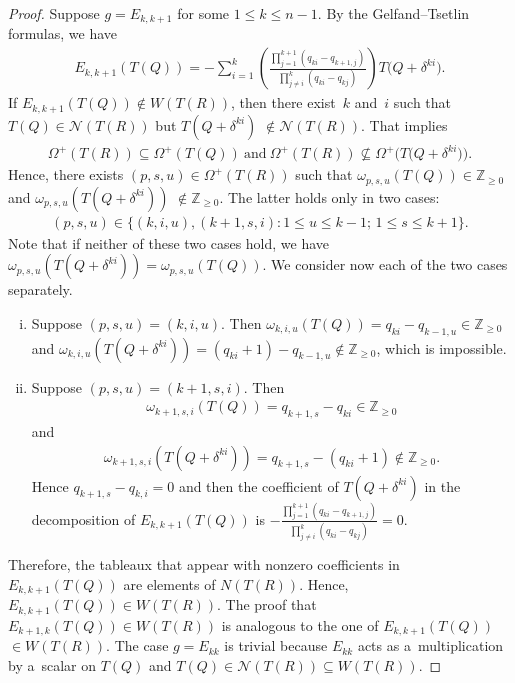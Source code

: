 \documentclass[pdftex]{sigma}
\numberwithin{equation}{section}
\begin{document}
\begin{proof}
Suppose $g=E_{k,k+1}$ for some $1\leq k\leq n-1$.
By the Gelfand--Tsetlin formulas, we have
\begin{gather*}
E_{k,k+1}(T(Q))=-\sum\limits_{i=1}^{k}\left(\frac{\prod\limits_{j=1}^{k+1}(q_{ki}-q_{k+1,j})}{\prod\limits_{j\neq
i}^{k}(q_{ki}-q_{kj})}\right)T\big(Q+\delta^{ki}\big).
\end{gather*}
If $E_{k,k+1}(T(Q))\notin W(T(R))$, then there exist~$k$ and~$i$ such that $T(Q)\in \mathcal{N}(T(R))$ but
$T(Q+\delta^{ki})$ $\notin\mathcal{N}(T(R))$.
That implies
\begin{gather*}
\Omega^{+}(T(R))\subseteq\Omega^{+}(T(Q))~\text{and}~\Omega^{+}(T(R))\nsubseteq\Omega^{+}\big(T\big(Q+\delta^{ki}\big)\big).
\end{gather*}
Hence, there exists $(p,s,u)\in\Omega^{+}(T(R))$ such that $\omega_{p,s,u}(T(Q))\in\mathbb{Z}_{\geq 0}$ and
$\omega_{p,s,u}(T(Q+\delta^{ki}))$ $\notin\mathbb{Z}_{\geq 0}$.
The latter holds only in two cases:
\begin{gather*}
(p,s,u)\in \{(k,i,u), (k+1,s,i): 1\leq u\leq k-1; \, 1\leq s\leq k+1\}.
\end{gather*}
Note that if neither of these two cases hold, we have $\omega_{p,s,u}(T(Q+\delta^{ki}))=\omega_{p,s,u}(T(Q))$.
We consider now each of the two cases separately.
\begin{enumerate}[(i)]\itemsep=0pt
\item Suppose $(p,s,u)=(k,i,u)$.
Then $\omega_{k,i,u}(T(Q))=q_{ki}-q_{k-1,u}\in\mathbb{Z}_{\geq 0}$ and
$\omega_{k,i,u}(T(Q+\delta^{ki}))=(q_{ki}+1)-q_{k-1,u}\notin \mathbb{Z}_{\geq 0}$, which is impossible.
\item Suppose $(p,s,u)=(k+1,s,i)$.
Then
\begin{gather*}
\omega_{k+1,s,i}(T(Q))=q_{k+1,s}-q_{ki}\in\mathbb{Z}_{\geq 0}
\end{gather*}
{and}
\begin{gather*}
\omega_{k+1,s,i}(T(Q+\delta^{ki}))=q_{k+1,s}-(q_{ki}+1)\notin \mathbb{Z}_{\geq 0}.
\end{gather*}
Hence $q_{k+1,s}-q_{k,i}=0$ and then the coef\/f\/icient of $T(Q+\delta^{ki})$ in the decomposition of $E_{k,k+1}(T(Q))$ is
$-\frac{\prod\limits_{j=1}^{k+1}(q_{ki}-q_{k+1,j})}{\prod\limits_{j\neq i}^{k}(q_{ki}-q_{kj})}=0$.
\end{enumerate}
Therefore, the tableaux that appear with nonzero coef\/f\/icients in $E_{k,k+1}(T(Q))$ are elements of $N(T(R))$.
Hence, $E_{k,k+1}(T(Q))\in W(T(R))$.
The proof that $E_{k+1,k}(T(Q))\in W(T(R))$ is analogous to the one of $E_{k,k+1}(T(Q))$ $\in W(T(R))$.
The case $g=E_{kk}$ is trivial because $E_{kk}$ acts as a~multiplication by a~scalar on $T(Q)$ and
$T(Q)\in\mathcal{N}(T(R))\subseteq W(T(R))$.
\end{proof}
\end{document}
